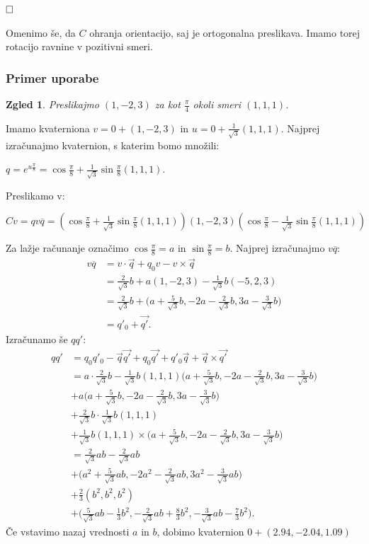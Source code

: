 \documentclass[a4paper,12pt]{article}
\newcommand{\conj}[1]{\overline{#1}}
\def\qed{$\hfill\Box$}   %
\newtheorem{zgled}{Zgled}
\begin{document}
\qed

Omenimo še, da $C$ ohranja orientacijo, saj je ortogonalna preslikava. Imamo torej rotacijo ravnine v pozitivni smeri. ~\cite{weiner2005quaternions}
\subsubsection{Primer uporabe}
\begin{zgled}
   Preslikajmo $(1, -2, 3)$ za kot $\frac{\pi}{4}$ okoli smeri $(1,1,1)$.
\end{zgled}
Imamo kvaterniona $v = 0 + (1,-2,3)$ in $u = 0 + \frac{1}{\sqrt{3}}(1,1,1)$.
Najprej izračunajmo kvaternion, s katerim bomo množili:
\begin{center}
   $q = e^{u\frac{\pi}{8}} = \cos\frac{\pi}{8} + \frac{1}{\sqrt{3}}\sin\frac{\pi}{8}(1,1,1)$.
\end{center}
Preslikamo v:
\begin{center}
   $Cv = qv\conj{q} = (\cos\frac{\pi}{8} + \frac{1}{\sqrt{3}}\sin\frac{\pi}{8}(1,1,1))(1,-2,3)(\cos\frac{\pi}{8} - \frac{1}{\sqrt{3}}\sin\frac{\pi}{8}(1,1,1))$
\end{center}
Za lažje računanje označimo $\cos\frac{\pi}{8} = a$ in $\sin\frac{\pi}{8} = b$. 
Najprej izračunajmo $v\conj{q}$:
\begin{align*}
   v\conj{q} &= v\cdot\vec{q} + q_{0}v - v \times \vec{q}\\
             &= \frac{2}{\sqrt{3}} b + a (1,-2,3) - \frac{1}{\sqrt{3}}b(-5,2,3)\\
             &= \frac{2}{\sqrt{3}}b + \bigl( a + \frac{5}{\sqrt{3}}b, -2 a - \frac{2}{\sqrt{3}}b, 3a - \frac{3}{\sqrt{3}}b \bigr)\\
             &= q'_{0} + \vec{q'}.
\end{align*}
Izračunamo še $qq'$:
\begin{align*}
   qq' &= q_{0}q'_{0} - \vec{q}\vec{q'} + q_{0}\vec{q'} + q'_{0}\vec{q} + \vec{q} \times \vec{q'}\\
       &= a \cdot \frac{2}{\sqrt{3}}b - \frac{1}{\sqrt{3}}b(1,1,1)\bigl( a + \frac{5}{\sqrt{3}}b, -2 a - \frac{2}{\sqrt{3}}b, 3a - \frac{3}{\sqrt{3}}b \bigr)\\
       &+ a \bigl( a + \frac{5}{\sqrt{3}}b, -2 a - \frac{2}{\sqrt{3}}b, 3a - \frac{3}{\sqrt{3}}b \bigr)\\
       &+ \frac{2}{\sqrt{3}}b \cdot \frac{1}{\sqrt{3}}b(1,1,1)\\
       &+ \frac{1}{\sqrt{3}}b(1,1,1) \times \bigl( a + \frac{5}{\sqrt{3}}b, -2 a - \frac{2}{\sqrt{3}}b, 3a - \frac{3}{\sqrt{3}}b \bigr)\\
       &= \frac{2}{\sqrt{3}}ab - \frac{2}{\sqrt{3}}ab\\
       &+ \bigl(a^2 + \frac{5}{\sqrt{3}}ab, -2a^2 - \frac{2}{\sqrt{3}}ab, 3a^2 - \frac{3}{\sqrt{3}}ab \bigr)\\
       &+ \frac{2}{3}(b^2, b^2, b^2)\\
       &+ \bigl( \frac{5}{\sqrt{3}}ab - \frac{1}{3}b^2, -\frac{2}{\sqrt{3}}ab + \frac{8}{3}b^2, -\frac{3}{\sqrt{3}}ab -\frac{7}{3}b^2\bigr).
\end{align*}
Če vstavimo nazaj vrednosti $a$ in $b$, dobimo kvaternion $0 + (2.94, -2.04, 1.09)$
\end{document}
